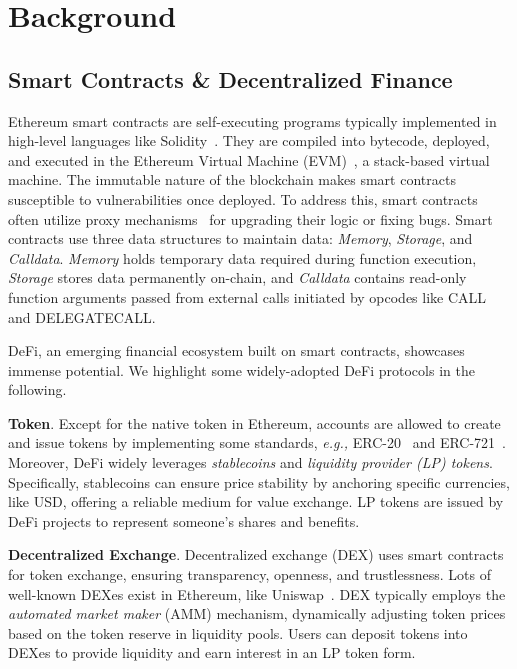 \section{Background}

\subsection{Smart Contracts \& Decentralized Finance}
\label{sec:smart}
Ethereum smart contracts are self-executing programs typically implemented in high-level languages like Solidity~\cite{dannen2017introducing}. They are compiled into bytecode, deployed, and executed in the Ethereum Virtual Machine (EVM)~\cite{hirai2017defining}, a stack-based virtual machine.
The immutable nature of the blockchain makes smart contracts susceptible to vulnerabilities once deployed. To address this, smart contracts often utilize proxy mechanisms~\cite{eip1967} for upgrading their logic or fixing bugs.
Smart contracts use three data structures to maintain data: \textit{Memory}, \textit{Storage}, and \textit{Calldata}. \textit{Memory} holds temporary data required during function execution, \textit{Storage} stores data permanently on-chain, and \textit{Calldata} contains read-only function arguments passed from external calls initiated by opcodes like CALL and DELEGATECALL.


DeFi, an emerging financial ecosystem built on smart contracts, showcases immense potential.
We highlight some widely-adopted DeFi protocols in the following.

\noindent
\textbf{Token}. Except for the native token in Ethereum, accounts are allowed to create and issue tokens by implementing some standards, \textit{e.g.,} ERC-20~\cite{erc20} and ERC-721~\cite{erc721}.
Moreover, DeFi widely leverages \textit{stablecoins} and \textit{liquidity provider (LP) tokens}. Specifically, stablecoins can ensure price stability by anchoring specific currencies, like USD, offering a reliable medium for value exchange. LP tokens are issued by DeFi projects to represent someone's shares and benefits.


\noindent
\textbf{Decentralized Exchange}. Decentralized exchange (DEX) uses smart contracts for token exchange, ensuring transparency, openness, and trustlessness. Lots of well-known DEXes exist in Ethereum, like Uniswap~\cite{uniswap}.
DEX typically employs the \textit{automated market maker} (AMM) mechanism, dynamically adjusting token prices based on the token reserve in liquidity pools.
Users can deposit tokens into DEXes to provide liquidity and earn interest in an LP token form.

